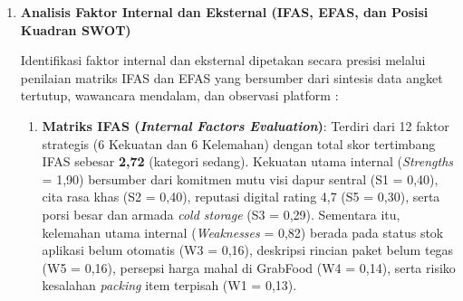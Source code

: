 \begin{enumerate}
\begin{enumerate}[label=\alph*.]
        \item \textbf{\textit{People} (Sumber Daya Manusia)}: Memiliki struktur kerja per divisi (\textit{checker}, \textit{display}, dapur, \textit{leader}, dan admin). Kelemahan utama berada pada akurasi pesanan saat jam sibuk, kecepatan layanan penyiapan, serta koordinasi antar-petugas dalam menjaga kualitas layanan berstandar tinggi.
        
        \item \textbf{\textit{Process} (Proses Penyiapan Pesanan dan Layanan)}: Merupakan titik krusial yang paling menentukan kepuasan pelanggan. Risiko utama terletak pada kesalahan \textit{packing} item terpisah atau berkuah, waktu tunggu pengantaran saat \textit{peak hour}, dan keterlambatan pembaruan ketersediaan stok menu pada aplikasi.
        
        \item \textbf{\textit{Physical Evidence} (Bukti Fisik dan Tampilan Digital)}: Tampilan etalase digital toko GrabFood dan kemasan produk dinilai rapi serta memberikan kepercayaan awal. Aspek yang perlu disempurnakan meliputi foto menu unggulan yang konsisten, kepastian ketersediaan stok, deskripsi rincian paket, serta penerapan segel atau label keamanan pada kemasan.
    \end{enumerate}

    \item \textbf{Analisis Faktor Internal dan Eksternal (IFAS, EFAS, dan Posisi Kuadran SWOT)}
    
    Identifikasi faktor internal dan eksternal dipetakan secara presisi melalui penilaian matriks IFAS dan EFAS yang bersumber dari sintesis data angket tertutup, wawancara mendalam, dan observasi platform \parencite{david2023strategicmanagement,rangkuti2016analisisSWOT}:
    
    \begin{enumerate}[label=\alph*.]
        \item \textbf{Matriks IFAS (\textit{Internal Factors Evaluation})}: Terdiri dari 12 faktor strategis (6 Kekuatan dan 6 Kelemahan) dengan total skor tertimbang IFAS sebesar \textbf{2,72} (kategori sedang). Kekuatan utama internal (\textit{Strengths} = 1,90) bersumber dari komitmen mutu visi dapur sentral (S1 = 0,40), cita rasa khas (S2 = 0,40), reputasi digital rating 4,7 (S5 = 0,30), serta porsi besar dan armada \textit{cold storage} (S3 = 0,29). Sementara itu, kelemahan utama internal (\textit{Weaknesses} = 0,82) berada pada status stok aplikasi belum otomatis (W3 = 0,16), deskripsi rincian paket belum tegas (W5 = 0,16), persepsi harga mahal di GrabFood (W4 = 0,14), serta risiko kesalahan \textit{packing} item terpisah (W1 = 0,13).
        

\end{enumerate}
\end{enumerate}
